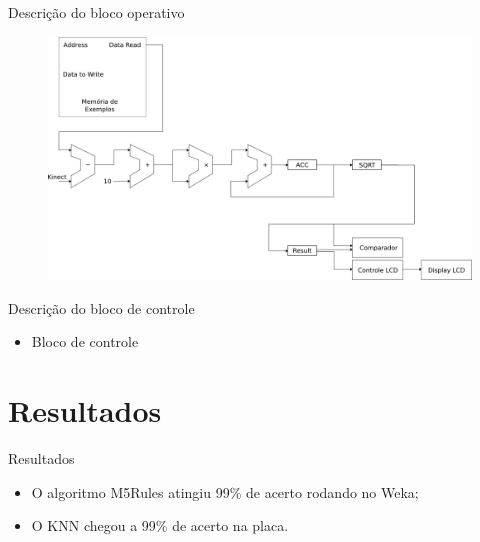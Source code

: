 \documentclass[11pt]{beamer}
\begin{document}
\begin{frame}{Descrição do bloco operativo}
	\begin{figure}[ht]
	\centering
	\includegraphics[width=1.0\textwidth]{knn_sem_controle}
	\label{fig:knn_sem_controle}
	\end{figure}
\end{frame}

\begin{frame}{Descrição do bloco de controle}
	\begin{itemize}
	\item Bloco de controle
	\end{itemize}
\end{frame}

\section{Resultados}
\begin{frame}{Resultados}

\begin{itemize}
	\item O algoritmo M5Rules atingiu 99\% de acerto rodando no Weka;
	\item O KNN chegou a 99\% de acerto na placa.
\end{itemize}

\end{frame}
\end{document}
